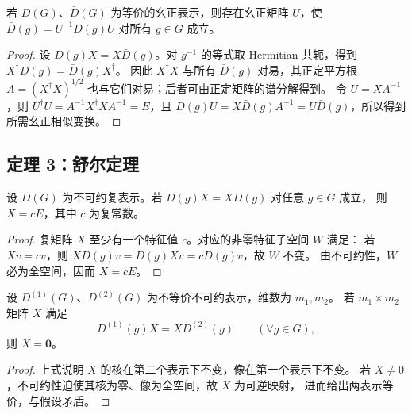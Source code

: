 \begin{theorem}[定理 2：等价幺正表示]
若 $D\left(G\right)$、$\bar D\left(G\right)$ 为等价的幺正表示，则存在幺正矩阵 $U$，使
$\bar D\left(g\right)=U^{-1}D\left(g\right)U$ 对所有 $g\in G$ 成立。
\end{theorem}
\begin{proof}
设 $D\left(g\right)X=X\bar D\left(g\right)$。对 $g^{-1}$ 的等式取 Hermitian 共轭，得到
$X^\dagger D\left(g\right)=\bar D\left(g\right)X^\dagger$。
因此 $X^\dagger X$ 与所有 $\bar D\left(g\right)$ 对易，其正定平方根
$A=\left(X^\dagger X\right)^{1/2}$ 也与它们对易；后者可由正定矩阵的谱分解得到。
令 $U=XA^{-1}$，则 $U^\dagger U=A^{-1}X^\dagger XA^{-1}=E$，且
$D\left(g\right)U=X\bar D\left(g\right)A^{-1}=U\bar D\left(g\right)$，所以得到所需幺正相似变换。
\end{proof}

\subsection{定理 3：舒尔定理}
\begin{theorem}[舒尔定理一]
设 $D\left(G\right)$ 为不可约复表示。若 $D\left(g\right)X=XD\left(g\right)$ 对任意 $g\in G$ 成立，
则 $X=cE$，其中 $c$ 为复常数。
\end{theorem}
\begin{proof}
复矩阵 $X$ 至少有一个特征值 $c$。对应的非零特征子空间 $W$ 满足：
若 $Xv=cv$，则 $X D\left(g\right)v=D\left(g\right)Xv=cD\left(g\right)v$，故 $W$ 不变。
由不可约性，$W$ 必为全空间，因而 $X=cE$。
\end{proof}

\begin{theorem}[舒尔定理二]
设 $D^{\left(1\right)}\left(G\right)$、$D^{\left(2\right)}\left(G\right)$ 为不等价不可约表示，维数为 $m_1,m_2$。
若 $m_1\times m_2$ 矩阵 $X$ 满足
\begin{equation}
D^{\left(1\right)}\left(g\right)X=XD^{\left(2\right)}\left(g\right)\qquad\left(\forall g\in G\right),
\end{equation}
则 $X=\bm{0}$。
\end{theorem}
\begin{proof}
上式说明 $X$ 的核在第二个表示下不变，像在第一个表示下不变。
若 $X\ne0$，不可约性迫使其核为零、像为全空间，故 $X$ 为可逆映射，
进而给出两表示等价，与假设矛盾。
\end{proof}

